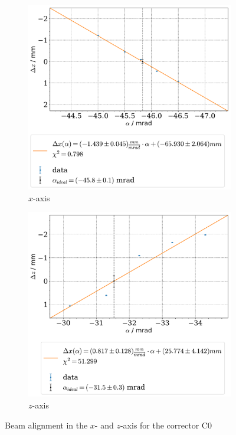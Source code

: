 \documentclass[11pt,a4paper,notitlepage]{scrartcl}
\begin{document}
\begin{figure}
	\begin{subfigure}{.49\linewidth}
		\includegraphics[width=\linewidth]{figs/calibration/q1_x.pdf}
		\caption{$x$-axis}
	\end{subfigure}
	\begin{subfigure}{.49\linewidth}
		\includegraphics[width=\linewidth]{figs/calibration/q1_z.pdf}
		\caption{$z$-axis}
	\end{subfigure}
	\caption{Beam alignment in the $x$- and $z$-axis for the corrector C0}\label{fig:quad_calib_1}
\end{figure}
\end{document}
